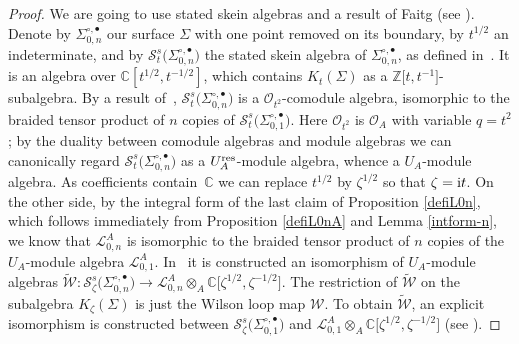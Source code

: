 \documentclass[pdftex]{sigma}%
\numberwithin{equation}{section}
\numberwithin{figure}{section}
\newcommand{\mc}{\mathbb{C}}
\newcommand{\mz}{\mathbb{Z}}
\newcommand{\Ll}{{\mathcal L}}
\newcommand{\Oo}{{\mathcal O}}
\newcommand{\ra}{\rightarrow}
\begin{document}
\begin{proof} We are going to use stated skein algebras and a result of Faitg (see \cite{Faitg4}). Denote by $\Sigma_{0,n}^{\circ,\bullet}$ our surface $\Sigma$ with one point removed on its boundary, by $t^{1/2}$ an indeterminate, and by $\mathcal{S}_t^s\big(\Sigma_{0,n}^{\circ,\bullet}\big)$ the stated skein algebra of $\Sigma_{0,n}^{\circ,\bullet}$, as defined in~\cite{Le2}. It is an algebra over $\mc[t^{1/2},t^{-1/2}]$, which contains $K_t(\Sigma)$ as a $\mz\big[t,t^{-1}\big]$-subalgebra. By a result of~\cite{CL}, $\mathcal{S}_t^s\big(\Sigma_{0,n}^{\circ,\bullet}\big)$ is a $\Oo_{t^2}$-comodule algebra, isomorphic to the braided tensor product of $n$ copies of $\mathcal{S}_t^s\big(\Sigma_{0,1}^{\circ,\bullet}\big)$. Here $\Oo_{t^2}$ is $\Oo_A$ with variable $q=t^2$; by the duality between comodule algebras and module algebras we can canonically regard $\mathcal{S}_t^s\big(\Sigma_{0,n}^{\circ,\bullet}\big)$ as a $U_A^{\rm res}$-module algebra, whence a $U_A$-module algebra. As coefficients contain~$\mc$ we can replace $t^{1/2}$ by $\zeta^{1/2}$ so that $\zeta= {\rm i}t$. On the other side, by the integral form of the last claim of Proposition \ref{defiL0n}, which follows immediately from Proposition \ref{defiL0nA} and Lemma \ref{intform-n}, we know that $\Ll_{0,n}^A$ is isomorphic to the braided tensor product of $n$ copies of the $U_A$-module algebra $\Ll_{0,1}^A$. In~\cite[Theorem 5.3]{Faitg4} it is constructed an isomorphism of $U_A$-module algebras $\tilde{\mathcal{W}}\colon \mathcal{S}_\zeta^s\big(\Sigma_{0,n}^{\circ,\bullet}\big)\ra \Ll_{0,n}^A\otimes_A \mc\big[\zeta^{1/2},\zeta^{-1/2}\big]$. The restriction of $\tilde{\mathcal{W}}$ on the subalgebra $K_\zeta(\Sigma)$ is just the Wilson loop map $\mathcal{W}$. To obtain $\tilde{\mathcal{W}}$, an explicit isomorphism is constructed between $\mathcal{S}_\zeta^s\big(\Sigma_{0,1}^{\circ,\bullet}\big)$ and $\Ll_{0,1}^A\otimes_A \mc\big[\zeta^{1/2},\zeta^{-1/2}\big]$ (see \cite[Lemmas~5.7 and~5.8]{Faitg4}).


\end{proof}
\end{document}
